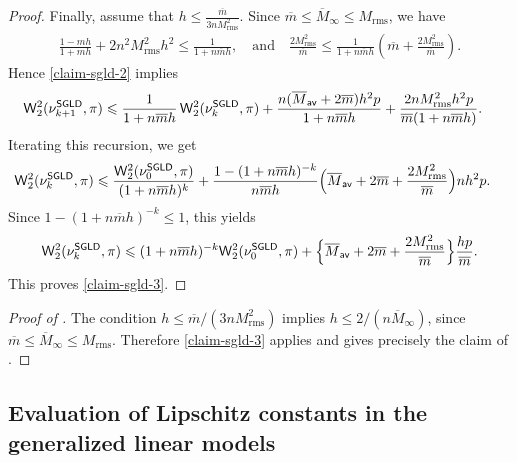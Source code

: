 \documentclass[aos,reqno]{imsart}
\def\wass{\mathsf{W}}
\def\Mtwo{M_{\mathrm{rms}}}
\def\mbar{\overline m}
\def\Mmaxbar{\overline M_{\infty}}
\def\Mavbar{\overline M_{\textsf{av}}}
\theoremstyle{definition}
\begin{document}
\begin{proof}
Finally, assume that $ h\leqslant \frac{\mbar}{3n
\Mtwo^2}$. Since $\mbar\leqslant \Mmaxbar\leqslant
\Mtwo$, we have
\begin{align}
    \frac{1-m h}{1+m h}
    +2n^2\Mtwo^2h^2 \leqslant
    \frac{1}{1+n\mbar h},\quad\text{and}\quad
    \frac{2\Mtwo^2}{\mbar}
    \leqslant
    \frac{1}{1+n\mbar h}
    \left(\mbar+\frac{2\Mtwo^2}{\mbar}\right).
\end{align}
Hence \eqref{claim-sgld-2} implies
\begin{align}
    \wass_2^2(\nu_{k+1}^{\sf SGLD},\pi)
    &\leqslant
    \frac{1}{1+n\mbar h}\,
    \wass_2^2(\nu_k^{\sf SGLD},\pi)  
    + \frac{n(\Mavbar+2\mbar)h^2p}{1+n\mbar h}
    + \frac{2n\Mtwo^2h^2p}
    {\mbar(1+n\mbar h)}.
\end{align}
Iterating this recursion, we get
\begin{align}
    \wass_2^2(\nu_k^{\sf SGLD},\pi)
    &\leqslant
    \frac{\wass_2^2(\nu_0^{\sf SGLD},\pi)}
    {(1+n\mbar h)^k} 
    + \frac{1-(1+n\mbar h)^{-k}}{n\mbar h}
    \Big(\Mavbar+2\mbar+\frac{2\Mtwo^2}{\mbar}\Big)
    nh^2p.
\end{align}
Since $1-(1+n\mbar h)^{-k}\leqslant 1$, this yields
\begin{align}
    \wass_2^2(\nu_k^{\sf SGLD},\pi)
    \leqslant
    (1+n\mbar h)^{-k}
    \wass_2^2(\nu_0^{\sf SGLD},\pi)
    + \Big\{\Mavbar+2\mbar+\frac{2\Mtwo^2}{\mbar}\Big\}
    \frac{hp}{\mbar}.
\end{align}
This proves \eqref{claim-sgld-3}.
\end{proof}

\begin{proof}[Proof of ]
The condition $h\leqslant \mbar/(3n\Mtwo^2)$ implies
$h\leqslant 2/(n\Mmaxbar)$, since
$\mbar\leqslant \Mmaxbar\leqslant \Mtwo$. Therefore
\eqref{claim-sgld-3} applies and gives precisely the
claim of .
\end{proof}
\subsection{Evaluation of Lipschitz constants in the 
generalized linear models}
\end{document}
